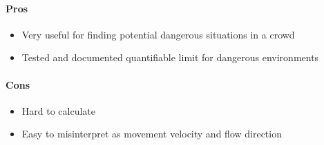 \paragraph{Pros}
\begin{itemize}
    \item Very useful for finding potential dangerous situations in a crowd
    \item Tested and documented quantifiable limit for dangerous environments
\end{itemize}

\paragraph{Cons}
\begin{itemize}
    \item Hard to calculate
    \item Easy to misinterpret as movement velocity and flow direction
\end{itemize}